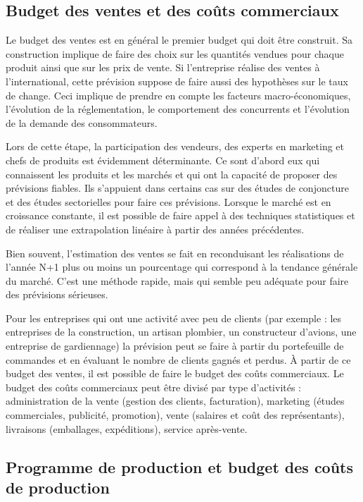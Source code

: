 \documentclass[oneside]{kaobook}
\begin{document}
\subsection{Budget des ventes et des coûts commerciaux}
\label{sec:org03fb1cb}
Le budget des ventes est en général le premier budget qui doit être construit. Sa construction implique de faire des choix sur les quantités vendues pour chaque produit ainsi que sur les prix de vente. Si l'entreprise réalise des ventes à l'international, cette prévision suppose de faire aussi des hypothèses sur le taux de change. Ceci implique de prendre en compte les facteurs macro-économiques, l'évolution de la réglementation, le comportement des concurrents et l'évolution de la demande des consommateurs.

Lors de cette étape, la participation des vendeurs, des experts en marketing et chefs de produits est évidemment déterminante. Ce sont d'abord eux qui connaissent les produits et les marchés et qui ont la capacité de proposer des prévisions fiables. Ils s'appuient dans certains cas sur des études de conjoncture et des études sectorielles pour faire ces prévisions. Lorsque le marché est en croissance constante, il est possible de faire appel à des techniques statistiques et de réaliser une extrapolation linéaire à partir des années précédentes.

Bien souvent, l'estimation des ventes se fait en reconduisant les réalisations de l'année N+1 plus ou moins un pourcentage qui correspond à la tendance générale du marché. C'est une méthode rapide, mais qui semble peu adéquate pour faire des prévisions sérieuses.

Pour les entreprises qui ont une activité avec peu de clients (par exemple : les entreprises de la construction, un artisan plombier, un constructeur d'avions, une entreprise de gardiennage) la prévision peut se faire à partir du portefeuille de commandes et en évaluant le nombre de clients gagnés et perdus.
À partir de ce budget des ventes, il est possible de faire le budget des coûts commerciaux. Le budget des coûts commerciaux peut être divisé par type d'activités : administration de la vente (gestion des clients, facturation), marketing (études commerciales, publicité, promotion), vente (salaires et coût des représentants), livraisons (emballages, expéditions), service après-vente.

\subsection{Programme de production et budget des coûts de production}
\label{sec:org661f76f}
\end{document}
